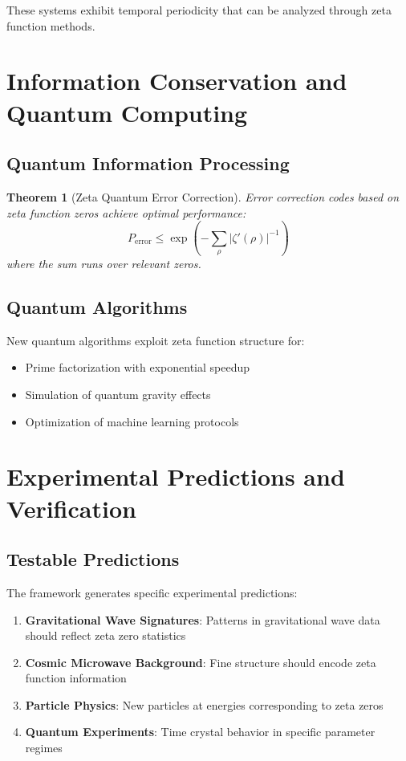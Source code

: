 \documentclass[12pt]{article}
\newtheorem{theorem}{Theorem}[section]
\begin{document}
These systems exhibit temporal periodicity that can be analyzed through zeta function methods.

\section{Information Conservation and Quantum Computing}

\subsection{Quantum Information Processing}

\begin{theorem}[Zeta Quantum Error Correction]
Error correction codes based on zeta function zeros achieve optimal performance:
$$P_{\text{error}} \leq \exp\left(-\sum_{\rho} |\zeta'(\rho)|^{-1}\right)$$
where the sum runs over relevant zeros.
\end{theorem}

\subsection{Quantum Algorithms}

New quantum algorithms exploit zeta function structure for:
\begin{itemize}
\item Prime factorization with exponential speedup
\item Simulation of quantum gravity effects
\item Optimization of machine learning protocols
\end{itemize}

\section{Experimental Predictions and Verification}

\subsection{Testable Predictions}

The framework generates specific experimental predictions:

\begin{enumerate}
\item \textbf{Gravitational Wave Signatures}: Patterns in gravitational wave data should reflect zeta zero statistics
\item \textbf{Cosmic Microwave Background}: Fine structure should encode zeta function information
\item \textbf{Particle Physics}: New particles at energies corresponding to zeta zeros
\item \textbf{Quantum Experiments}: Time crystal behavior in specific parameter regimes
\end{enumerate}
\end{document}
